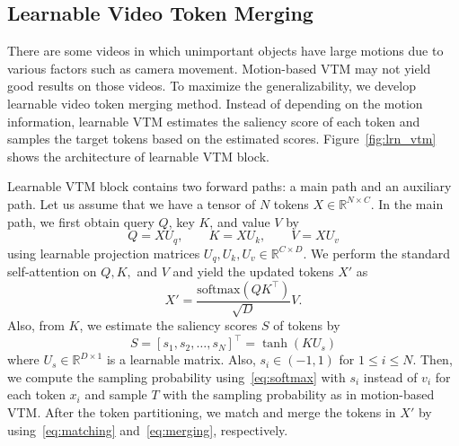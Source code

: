 \documentclass{article}
\begin{document}
\vspace{-0.2cm}
\subsection{Learnable Video Token Merging}
\vspace{-0.2cm}
There are some videos in which unimportant objects have large motions due to various factors such as camera movement. Motion-based VTM may not yield good results on those videos. To maximize the generalizability, we develop learnable video token merging method. Instead of depending on the motion information, learnable VTM estimates the saliency score of each token and samples the target tokens based on the estimated scores. Figure~\ref{fig:lrn_vtm} shows the architecture of learnable VTM block. 

Learnable VTM block contains two forward paths: a main path and an auxiliary path. Let us assume that we have a tensor of $N$ tokens $X \in \mathbb{R}^{N \times C}$. 
In the main path, we first obtain query $Q$, key $K$, and value $V$ by
\begin{equation} \label{eq:qkv}
    Q = XU_q, \qquad K = XU_k, \qquad V = XU_v
\end{equation}
using learnable projection matrices $U_q, U_k, U_v \in \mathbb{R}^{C \times D}$. We perform the standard self-attention on $Q, K,$ and $V$ and yield the updated tokens $X'$ as
\begin{equation}
    X' = \frac{\mathrm{softmax}(QK^\top)}{\sqrt{D}}V .
\end{equation}
Also, from $K$, we estimate the saliency scores $S$ of tokens by  
\begin{equation}\label{eq:saliency}
S = [s_1, s_2, \ldots, s_N]^\top = \tanh({KU_s})
\end{equation}
where $U_s \in \mathbb{R}^{D \times 1}$ is a learnable matrix. Also, $s_i \in (-1, 1)$ for $1 \leq i \leq N$. Then, we compute the sampling probability using~\eqref{eq:softmax} with $s_i$ instead of $v_i$ for each token $x_i$ and sample $T$ with the sampling probability as in motion-based VTM. After the token partitioning, we match and merge the tokens in $X'$ by using~\eqref{eq:matching} and~\eqref{eq:merging}, respectively.
\end{document}
